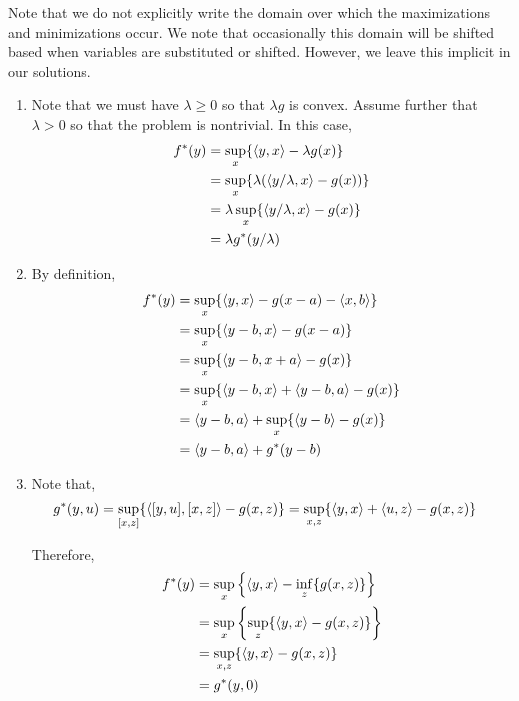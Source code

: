 \documentclass[10pt]{article}
\begin{document}
\begin{solution}[Solution]
    Note that we do not explicitly write the domain over which the maximizations and minimizations occur. We note that occasionally this domain will be shifted based when variables are substituted or shifted. However, we leave this implicit in our solutions.
\begin{enumerate}[label=(\alph*)]
    \item Note that we must have \( \lambda \geq 0 \) so that \( \lambda g \) is convex. Assume further that \( \lambda>0 \) so that the problem is nontrivial.
        In this case,
        \begin{align*}
            f^*(y) 
            &= \sup_{x} \{ \left\langle y,x \right\rangle - \lambda g(x) \}
            \\&= \sup_{x} \{ \lambda ( \left\langle y/\lambda,x \right\rangle - g(x)) \}
            \\& = \lambda \sup_{x} \{ \left\langle y/\lambda,x \right\rangle - g(x) \}
            \\&= \lambda g^*(y/\lambda)
        \end{align*}
       
    \item By definition,
        \begin{align*}
            f^*(y) 
            &= \sup_{x} \{ \left\langle y,x \right\rangle - g(x-a) - \left\langle x,b \right\rangle \}
            \\&= \sup_{x} \{ \left\langle y-b,x \right\rangle - g(x-a) \}
            \\&= \sup_{x} \{ \left\langle y-b,x+a \right\rangle - g(x) \}
            \\&= \sup_{x} \{ \left\langle y-b,x \right\rangle + \left\langle y-b,a \right\rangle - g(x) \}
            \\&= \left\langle y-b,a \right\rangle +  \sup_{x} \{ \left\langle y-b \right\rangle - g(x) \}
            \\&= \left\langle y-b,a \right\rangle + g^*(y-b)
        \end{align*}
        
    \item
        Note that,
        \begin{align*}
            g^*(y,u) &= \sup_{[x,z]} \{ \left\langle [y,u],[x,z] \right\rangle - g(x,z) \}
            = \sup_{x,z} \{ \left\langle y,x \right\rangle + \left\langle u,z \right\rangle - g(x,z) \}
        \end{align*}

        Therefore,        
        \begin{align*}
            f^*(y) 
            &= \sup_{x} \left\{ \left\langle y,x \right\rangle - \inf_z\{g(x,z)\} \right\}
            \\&= \sup_{x} \left\{ \sup_z\{ \left\langle y,x \right\rangle - g(x,z) \} \right\}
            \\&= \sup_{x,z} \{ \left\langle y,x \right\rangle - g(x,z) \}
            \\&= g^*(y,0)
        \end{align*}
        

\end{enumerate}
\end{solution}
\end{document}
